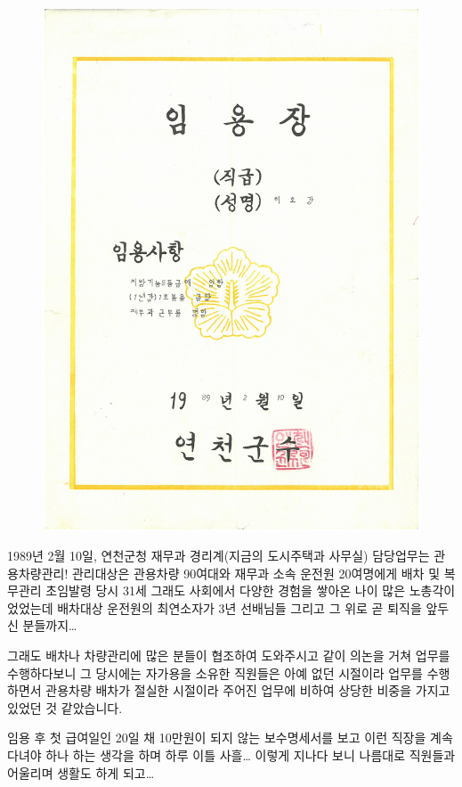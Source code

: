 \documentclass[chapter,book,openany,twoside]{oblivoir}
\begin{document}
\begin{figure}[h]
\centering \includegraphics[scale=0.3]{DBs/pic/004.jpg}\\
\end{figure}

1989년 2월 10일, 연천군청 재무과 경리계(지금의 도시주택과 사무실) 담당업무는 관용차량관리! 관리대상은 관용차량 90여대와 재무과 소속 운전원 20여명에게 배차 및 복무관리 초임발령 당시 31세 그래도 사회에서 다양한 경험을 쌓아온 나이 많은 노총각이었었는데 배차대상 운전원의 최연소자가 3년 선배님들 그리고 그 위로 곧 퇴직을 앞두신 분들까지…

그래도 배차나 차량관리에 많은 분들이 협조하여 도와주시고 같이 의논을 거쳐 업무를 수행하다보니 그 당시에는 자가용을 소유한 직원들은 아예 없던 시절이라 업무를 수행하면서 관용차량 배차가 절실한 시절이라 주어진 업무에 비하여 상당한 비중을 가지고 있었던 것 같았습니다.

임용 후 첫 급여일인 20일 채 10만원이 되지 않는 보수명세서를 보고 이런 직장을 계속 다녀야 하나 하는 생각을 하며 하루 이틀 사흘… 이렇게 지나다 보니 나름대로 직원들과 어울리며 생활도 하게 되고…
\end{document}
